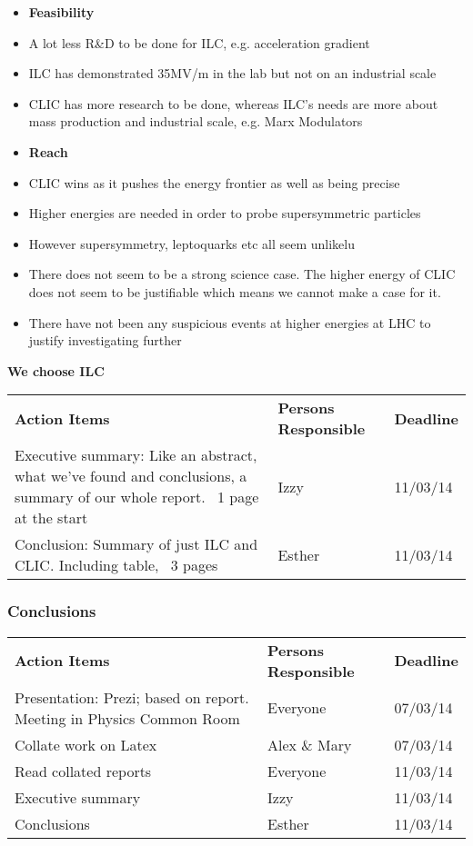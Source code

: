 \begin{itemize}
\item \textbf{Feasibility}
\item  A lot less R\&D to be done for ILC, e.g. acceleration gradient
\item  ILC has demonstrated 35MV/m in the lab but not on an industrial scale
\item  CLIC has more research to be done, whereas ILC’s needs are more about mass production and  industrial scale, e.g. Marx Modulators
\item \textbf{Reach}
\item  CLIC wins as it pushes the energy frontier as well as being precise
\item  Higher energies are needed in order to probe supersymmetric particles
\item  However supersymmetry, leptoquarks etc all seem unlikelu
\item  There does not seem to be a strong science case. The higher energy of CLIC does not seem to be justifiable which means we cannot make a case for it.
\item  There have not been any suspicious events at higher energies at LHC to justify investigating further
\end{itemize}

\textbf{We choose ILC}

\begin{tabularx}{\textwidth}{X p{4.5cm} p{1.2cm}}
  \textbf{Action Items} & \textbf{Persons Responsible} & \textbf{Deadline} \\

Executive summary: Like an abstract, what we’ve found and conclusions, a summary of our whole report. ~1 page at the start
& Izzy &
11/03/14 \\

Conclusion: Summary of just ILC and CLIC. Including table, ~3 pages
& Esther &
11/03/14 \\

\end{tabularx}

\subsubsection{Conclusions}

\begin{tabularx}{\textwidth}{X p{4.5cm} p{1.2cm}}
  \textbf{Action Items} & \textbf{Persons Responsible} & \textbf{Deadline} \\

Presentation: Prezi; based on report. Meeting in Physics Common Room
& Everyone &
07/03/14 \\

Collate work on Latex
& Alex \& Mary &
07/03/14 \\
 
 Read collated reports
& Everyone &
11/03/14 \\

Executive summary
& Izzy &
11/03/14 \\

Conclusions
& Esther  &
11/03/14 \\

\end{tabularx}

